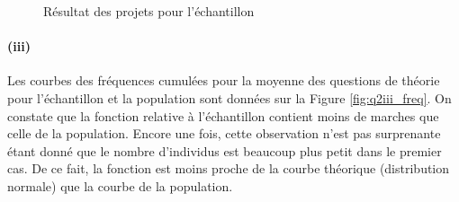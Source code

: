 \documentclass[a4paper,11pt]{article}
\begin{document}
\begin{figure}[!h]
	\caption{Résultat des projets pour l'échantillon}
	\label{fig:q2a_boxplot}
\end{figure}

\paragraph{(iii)} Les courbes des fréquences cumulées pour la moyenne des questions de théorie pour l'échantillon et la population sont données sur la Figure \ref{fig:q2iii_freq}. On constate que la fonction relative à l'échantillon contient moins de marches que celle de la population. Encore une fois, cette observation n'est pas surprenante étant donné que le nombre d'individus est beaucoup plus petit dans le premier cas. De ce fait, la fonction est moins proche de la courbe théorique (distribution normale) que la courbe de la population.
\end{document}
